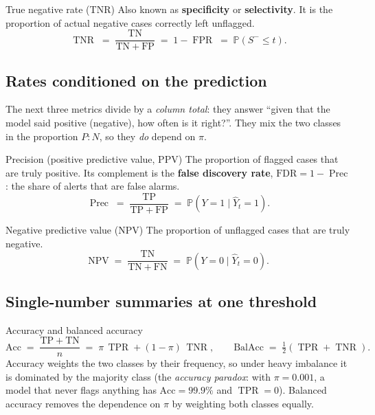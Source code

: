 \documentclass[11pt,a4paper]{article}
\newcommand{\Prob}{\mathbb{P}}
\DeclareMathOperator{\TPR}{TPR}
\DeclareMathOperator{\FPR}{FPR}
\DeclareMathOperator{\TNR}{TNR}
\DeclareMathOperator{\Prec}{Prec}
\theoremstyle{plain}
\theoremstyle{definition}
\theoremstyle{remark}
\begin{document}
\begin{metric}{True negative rate (TNR)}
Also known as \textbf{specificity} or \textbf{selectivity}. It is the proportion of actual negative cases
correctly left unflagged.
\[
  \TNR \;=\; \frac{\mathrm{TN}}{\mathrm{TN}+\mathrm{FP}} \;=\; 1-\FPR \;=\; \Prob(S^{-}\le t).
\]
\end{metric}

\subsection{Rates conditioned on the prediction}
The next three metrics divide by a \emph{column total}: they answer ``given that the model said
positive (negative), how often is it right?''. They mix the two classes in the proportion
$P:N$, so they \emph{do} depend on $\pi$.

\begin{metric}{Precision (positive predictive value, PPV)}
The proportion of flagged cases that are truly positive. Its complement is the
\textbf{false discovery rate}, $\mathrm{FDR}=1-\Prec$: the share of alerts that are false alarms.
\[
  \Prec \;=\; \frac{\mathrm{TP}}{\mathrm{TP}+\mathrm{FP}} \;=\; \Prob(Y=1\mid \hat Y_t=1).
\]
\end{metric}

\begin{metric}{Negative predictive value (NPV)}
The proportion of unflagged cases that are truly negative.
\[
  \mathrm{NPV} \;=\; \frac{\mathrm{TN}}{\mathrm{TN}+\mathrm{FN}} \;=\; \Prob(Y=0\mid \hat Y_t=0).
\]
\end{metric}

\subsection{Single-number summaries at one threshold}

\begin{metric}{Accuracy and balanced accuracy}
\[
  \mathrm{Acc} \;=\; \frac{\mathrm{TP}+\mathrm{TN}}{n} \;=\; \pi\,\TPR + (1-\pi)\,\TNR,
  \qquad
  \mathrm{BalAcc} \;=\; \tfrac12(\TPR+\TNR).
\]
Accuracy weights the two classes by their frequency, so under heavy imbalance it is dominated by the
majority class (the \emph{accuracy paradox}: with $\pi=0.001$, a model that never flags anything has
$\mathrm{Acc}=99.9\%$ and $\TPR=0$). Balanced accuracy removes the dependence on $\pi$ by
weighting both classes equally.
\end{metric}
\end{document}
